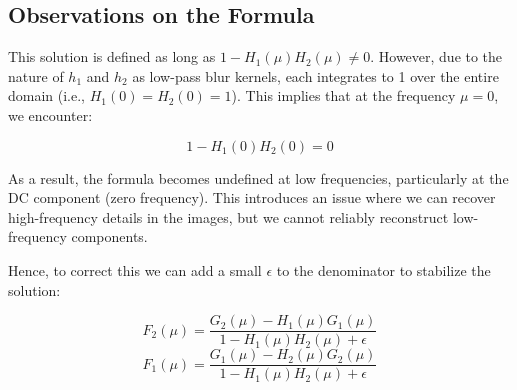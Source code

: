 \documentclass{article}
\begin{document}
\subsection*{Observations on the Formula}

This solution is defined as long as \( 1 - H_1(\mu) H_2(\mu) \neq 0 \). However, due to the nature of \( h_1 \) and \( h_2 \) as low-pass blur kernels, each integrates to 1 over the entire domain (i.e., \( H_1(0) = H_2(0) = 1 \)). This implies that at the frequency \( \mu = 0 \), we encounter:

\[
1 - H_1(0) H_2(0) = 0
\]

As a result, the formula becomes undefined at low frequencies, particularly at the DC component (zero frequency). This introduces an issue where we can recover high-frequency details in the images, but we cannot reliably reconstruct low-frequency components.

Hence, to correct this we can add a small \( \epsilon \) to the denominator to stabilize the solution:

\[
F_2(\mu) = \frac{G_2(\mu) - H_1(\mu) G_1(\mu)}{1 - H_1(\mu) H_2(\mu) + \epsilon}
\]
\[
F_1(\mu) = \frac{G_1(\mu) - H_2(\mu) G_2(\mu)}{1 - H_1(\mu) H_2(\mu) + \epsilon}
\]
\end{document}
